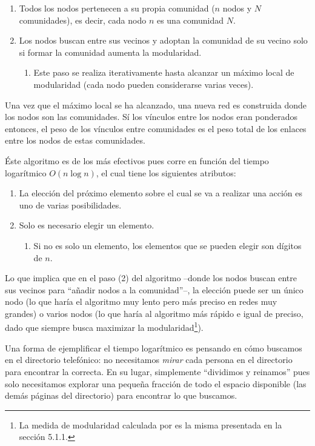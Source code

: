\documentclass[12pt,letter]{article}
\begin{document}
\begin{enumerate}
\item Todos los nodos pertenecen a su propia comunidad ($n$ nodos y $N$ comunidades), es decir, cada nodo $n$ es una comunidad $N$.

\item Los nodos buscan entre sus vecinos y adoptan la comunidad de su vecino solo si formar la comunidad aumenta la modularidad.

\begin{enumerate}
\item Este paso se realiza iterativamente hasta alcanzar un máximo local de modularidad (cada nodo pueden considerarse varias veces).
\end{enumerate}
\end{enumerate}

Una vez que el máximo local se ha alcanzado, una nueva red es construida donde los nodos son las comunidades. Sí los vínculos entre los nodos eran ponderados entonces, el peso de los vínculos entre comunidades es el peso total de los enlaces entre los nodos de estas comunidades.

Éste algoritmo es de los más efectivos pues corre en función del tiempo logarítmico $O(n \log n)$, el cual tiene los siguientes atributos:
\begin{enumerate}
\item La elección del próximo elemento sobre el cual se va a realizar una acción es uno de varias posibilidades.
\item Solo es necesario elegir un elemento.
\begin{enumerate}
\item Si no es solo un elemento, los elementos que se pueden elegir son dígitos de $n$.
\end{enumerate}
\end{enumerate}

Lo que implica que en el paso (2) del algoritmo --donde los nodos buscan entre sus vecinos para ``añadir nodos a la comunidad''--, la elección puede ser un único nodo (lo que haría el algoritmo muy lento pero más preciso en redes muy grandes) o varios nodos (lo que haría al algoritmo más rápido e igual de preciso, dado que siempre busca maximizar la modularidad\footnote{La medida de modularidad calculada por \cite{Blondel} es la misma presentada en la sección 5.1.1.}).
\vspace{0.5cm}


Una forma de ejemplificar el tiempo logarítmico es pensando en cómo buscamos en el directorio telefónico: no necesitamos \emph{mirar} cada persona en el directorio para encontrar la correcta. En su lugar, simplemente ``dividimos y reinamos'' pues solo necesitamos explorar una pequeña fracción de todo el espacio disponible (las demás páginas del directorio) para encontrar lo que buscamos.
\end{document}
